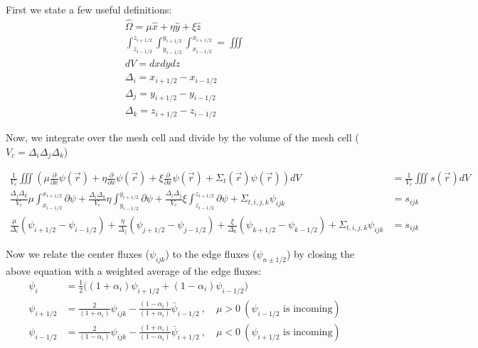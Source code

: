 \documentclass[10pt]{article}
\begin{document}
First we state a few useful definitions:
%
\begin{gather*}
     \hat{\Omega} = \mu\hat{x} + \eta\hat{y} + \xi\hat{z} \\
     \int_{z_{i - 1/2}}^{z_{i + 1/2}} \int_{y_{i - 1/2}}^{y_{i + 1/2}} \int_{x_{i - 1/2}}^{x_{i + 1/2}} = \iiint \\
     dV = dxdydz \\
     \Delta_i = x_{i + 1/2 } - x_{i - 1/2} \\
     \Delta_j = y_{i + 1/2 } - y_{i - 1/2} \\
     \Delta_k = z_{i + 1/2 } - z_{i - 1/2}
\end{gather*}

Now, we integrate over the mesh cell and divide by the volume of the mesh cell ($V_c = \Delta_i\Delta_j\Delta_k$)

\begin{align*}
    \frac{1}{V_c}\iiint \left( \mu \frac{\partial}{\partial x} \psi(\vec{r}) + \eta \frac{\partial}{\partial x} \psi(\vec{r})  +\xi \frac{\partial}{\partial x} \psi(\vec{r})  + \Sigma_t(\vec{r}) \psi(\vec{r}) \right) dV &= \frac{1}{V_c}\iiint s(\vec{r}) dV \\
    \frac{\Delta_j\Delta_k}{V_c} \mu \int_{x_{i - 1/2}}^{x_{i + 1/2}} \partial \psi  + \frac{\Delta_i\Delta_k}{V_c} \eta \int_{y_{i - 1/2}}^{y_{i + 1/2}} \partial \psi + \frac{\Delta_i\Delta_j}{V_c} \xi \int_{z_{i - 1/2}}^{z_{i + 1/2}} \partial \psi + \Sigma_{t,i,j,k}\psi_{ijk} &= s_{ijk}  \\
    \frac{\mu}{\Delta_i} (\psi_{i+1/2} - \psi_{i-1/2} ) + \frac{\eta}{\Delta_j} (\psi_{j+1/2} - \psi_{j-1/2} ) + \frac{\xi}{\Delta_k} (\psi_{k+1/2} - \psi_{k-1/2} ) + \Sigma_{t,i,j,k}\psi_{ijk} &= s_{ijk}
\end{align*}

Now we relate the center fluxes ($\psi_{ijk}$) to the edge fluxes ($\psi_{n\pm 1/2}$) by closing the above equation with a weighted average of the edge fluxes:
%
\begin{align*}
\psi_{i} &= \frac{1}{2}\bigl((1+\alpha_i)\psi_{i+1/2}+(1-\alpha_i)\psi_{i-1/2}\bigr)\\
\psi_{i+1/2} &= \frac{2}{(1+\alpha_i)}\psi_{ijk}-
    \frac{(1-\alpha_i)}{(1+\alpha_i)}\bar{\psi}_{i-1/2}\:,\quad \mu>0\:(\psi_{i-1/2}\text{ is incoming})\\
\psi_{i-1/2} &= \frac{2}{(1-\alpha_i)}\psi_{ijk}-
    \frac{(1+\alpha_i)}{(1-\alpha_i)}\bar{\psi}_{i+1/2}\:,\quad \mu<0 \:(\psi_{i+1/2}\text{ is incoming})
\end{align*}
\end{document}
